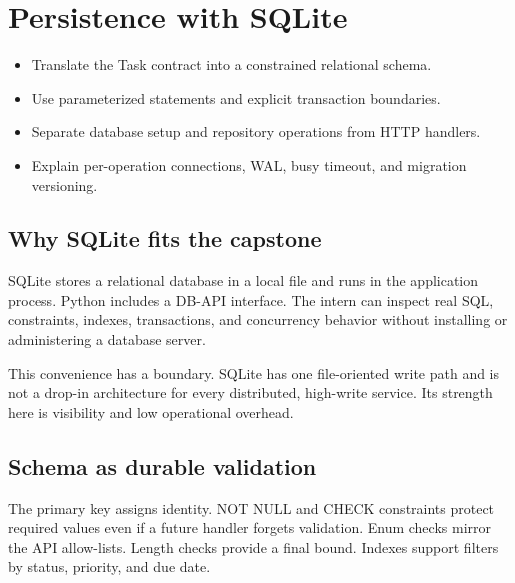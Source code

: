 \chapter{Persistence with SQLite}

\begin{objectives}
\begin{itemize}
  \item Translate the Task contract into a constrained relational schema.
  \item Use parameterized statements and explicit transaction boundaries.
  \item Separate database setup and repository operations from HTTP handlers.
  \item Explain per-operation connections, WAL, busy timeout, and migration versioning.
\end{itemize}
\end{objectives}

\section{Why SQLite fits the capstone}

SQLite stores a relational database in a local file and runs in the application
process. Python includes a DB-API interface. The intern can inspect real SQL,
constraints, indexes, transactions, and concurrency behavior without installing
or administering a database server.

This convenience has a boundary. SQLite has one file-oriented write path and is
not a drop-in architecture for every distributed, high-write service. Its
strength here is visibility and low operational overhead.

\section{Schema as durable validation}


The primary key assigns identity. NOT NULL and CHECK constraints protect required
values even if a future handler forgets validation. Enum checks mirror the API
allow-lists. Length checks provide a final bound. Indexes support filters by
status, priority, and due date.

